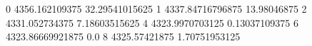 0 4356.162109375 32.29541015625
1 4337.84716796875 13.98046875
2 4331.052734375 7.18603515625
4 4323.9970703125 0.13037109375
6 4323.86669921875 0.0
8 4325.57421875 1.70751953125
